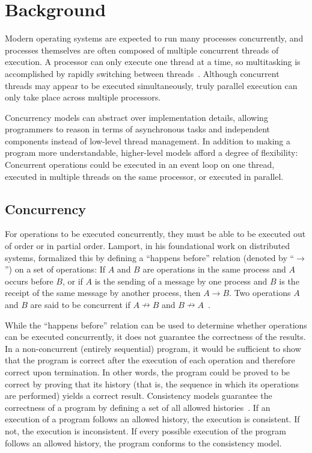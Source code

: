 \documentclass{sig-alternate}
\begin{document}
\section{Background}

Modern operating systems are expected to run many processes concurrently, and processes themselves are often composed of multiple concurrent threads of execution. A processor can only execute one thread at a time, so multitasking is accomplished by rapidly switching between threads~\cite{Liu1973}. Although concurrent threads may appear to be executed simultaneously, truly parallel execution can only take place across multiple processors.

Concurrency models can abstract over implementation details, allowing programmers to reason in terms of asynchronous tasks and independent components instead of low-level thread management. In addition to making a program more understandable, higher-level models afford a degree of flexibility: Concurrent operations could be executed in an event loop on one thread, executed in multiple threads on the same processor, or executed in parallel.

\subsection{Concurrency}

For operations to be executed concurrently, they must be able to be executed out of order or in partial order. Lamport, in his foundational work on distributed systems, formalized this by defining a ``happens before'' relation (denoted by ``$\rightarrow$'') on a set of operations: If $A$ and $B$ are operations in the same process and $A$ occurs before $B$, or if $A$ is the sending of a message by one process and $B$ is the receipt of the same message by another process, then $A \rightarrow B$. Two operations $A$ and $B$ are said to be concurrent if $A \nrightarrow B$ and $B \nrightarrow A$~\cite{Lamport1978}.

While the ``happens before'' relation can be used to determine whether operations can be executed concurrently, it does not guarantee the correctness of the results. In a non-concurrent (entirely sequential) program, it would be sufficient to show that the program is correct after the execution of each operation and therefore correct upon termination. In other words, the program could be proved to be correct by proving that its history (that is, the sequence in which its operations are performed) yields a correct result. Consistency models guarantee the correctness of a program by defining a set of all allowed histories~\cite{Ziv2015}. If an execution of a program follows an allowed history, the execution is consistent. If not, the execution is inconsistent. If every possible execution of the program follows an allowed history, the program conforms to the consistency model.
\end{document}
